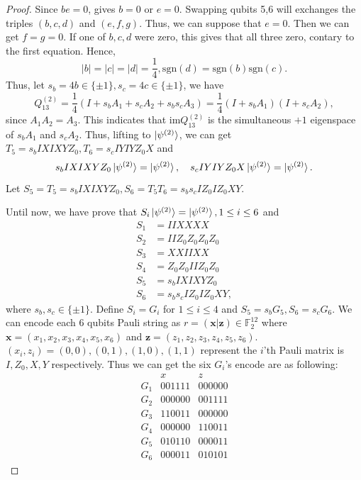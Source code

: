 \begin{proof}
Since $be=0$, gives $b=0$ or $e=0$. Swapping qubits 5,6 will exchanges the triples $(b,c,d)$ and $(e,f,g)$. Thus, we can suppose that $e=0$. Then we can get $f=g=0$. If one of $b,c,d$ were zero, this gives that all three zero, contary to the first equation. Hence,
\begin{equation}
    \lvert b\rvert=\lvert c\rvert=\lvert d\rvert=\frac{1}{4}, \mathrm{sgn}(d)=\mathrm{sgn}(b)\mathrm{sgn}(c).
\end{equation}
Thus, let $s_b=4b\in\{\pm1\},s_c=4c\in\{\pm1\}$, we have 
\begin{equation}
    Q_{13}^{(2)}=\frac{1}{4}(I+s_bA_1+s_cA_2+s_bs_cA_3)=\frac{1}{4}(I+s_bA_1)(I+s_cA_2),
\end{equation}
since $A_1A_2=A_3$. This indicates that $\mathrm{im} Q_{13}^{(2)}$ is the simultaneous $+1$ eigenspace of $s_bA_1$ and $s_cA_2$. Thus, lifting to $\ket{\psi^{(2)}}$, we can get $T_5=s_bIXIXYZ_0,T_6=s_cIYIYZ_0X$ and
\begin{equation}
    s_bIXIXYZ_0\ket{\psi^{(2)}}=\ket{\psi^{(2)}}, \quad s_cIYIYZ_0X\ket{\psi^{(2)}}=\ket{\psi^{(2)}}.
\end{equation}
Let $S_5=T_5=s_bIXIXYZ_0,S_6=T_5T_6=s_bs_cIZ_0IZ_0XY$.


Until now, we have prove that $S_i\ket{\psi^{(2)}}=\ket{\psi^{(2)}}, 1\leq i\leq 6$ and 
\begin{align*}
    S_1&=IIXXXX\\
    S_2&=IIZ_0Z_0Z_0Z_0\\
    S_3&=XXIIXX\\
    S_4&=Z_0Z_0IIZ_0Z_0\\
    S_5&=s_bIXIXYZ_0\\
    S_6&=s_bs_cIZ_0IZ_0XY,
\end{align*}
where $s_b,s_c\in\{\pm 1\}$. Define $S_i=G_i$ for $1\leq i\leq 4$ and $S_5=s_bG_5,S_6=s_cG_6$. We can encode each 6 qubits Pauli string as $r=(\mathbf{x|z})\in \mathbb{F}_2^{12}$ where $\mathbf{x}=(x_1,x_2,x_3,x_4,x_5,x_6)$ and $\mathbf{z}=(z_1,z_2,z_3,z_4,z_5,z_6)$. $(x_i,z_i)=(0,0),(0,1),(1,0),(1,1)$ represent the $i$'th Pauli matrix is $I,Z_0,X,Y$ respectively. Thus we can get the six $G_i$'s encode are as following:
\begin{equation}
\begin{array}{c|c|c}
 & x & z \\ \hline
G_1 & 001111 & 000000 \\
G_2 & 000000 & 001111 \\
G_3 & 110011 & 000000 \\
G_4 & 000000 & 110011 \\
G_5 & 010110 & 000011 \\
G_6 & 000011 & 010101
\end{array}
\end{equation}


\end{proof}
